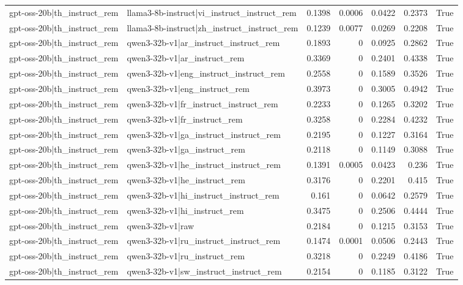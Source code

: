\begin{table}
\begin{tabular}{l l r r r r l}
gpt-oss-20b|th_instruct_rem & llama3-8b-instruct|vi_instruct_instruct_rem & 0.1398 & 0.0006 & 0.0422 & 0.2373 & True \\
gpt-oss-20b|th_instruct_rem & llama3-8b-instruct|zh_instruct_instruct_rem & 0.1239 & 0.0077 & 0.0269 & 0.2208 & True \\
gpt-oss-20b|th_instruct_rem & qwen3-32b-v1|ar_instruct_instruct_rem & 0.1893 & 0 & 0.0925 & 0.2862 & True \\
gpt-oss-20b|th_instruct_rem & qwen3-32b-v1|ar_instruct_rem & 0.3369 & 0 & 0.2401 & 0.4338 & True \\
gpt-oss-20b|th_instruct_rem & qwen3-32b-v1|eng_instruct_instruct_rem & 0.2558 & 0 & 0.1589 & 0.3526 & True \\
gpt-oss-20b|th_instruct_rem & qwen3-32b-v1|eng_instruct_rem & 0.3973 & 0 & 0.3005 & 0.4942 & True \\
gpt-oss-20b|th_instruct_rem & qwen3-32b-v1|fr_instruct_instruct_rem & 0.2233 & 0 & 0.1265 & 0.3202 & True \\
gpt-oss-20b|th_instruct_rem & qwen3-32b-v1|fr_instruct_rem & 0.3258 & 0 & 0.2284 & 0.4232 & True \\
gpt-oss-20b|th_instruct_rem & qwen3-32b-v1|ga_instruct_instruct_rem & 0.2195 & 0 & 0.1227 & 0.3164 & True \\
gpt-oss-20b|th_instruct_rem & qwen3-32b-v1|ga_instruct_rem & 0.2118 & 0 & 0.1149 & 0.3088 & True \\
gpt-oss-20b|th_instruct_rem & qwen3-32b-v1|he_instruct_instruct_rem & 0.1391 & 0.0005 & 0.0423 & 0.236 & True \\
gpt-oss-20b|th_instruct_rem & qwen3-32b-v1|he_instruct_rem & 0.3176 & 0 & 0.2201 & 0.415 & True \\
gpt-oss-20b|th_instruct_rem & qwen3-32b-v1|hi_instruct_instruct_rem & 0.161 & 0 & 0.0642 & 0.2579 & True \\
gpt-oss-20b|th_instruct_rem & qwen3-32b-v1|hi_instruct_rem & 0.3475 & 0 & 0.2506 & 0.4444 & True \\
gpt-oss-20b|th_instruct_rem & qwen3-32b-v1|raw & 0.2184 & 0 & 0.1215 & 0.3153 & True \\
gpt-oss-20b|th_instruct_rem & qwen3-32b-v1|ru_instruct_instruct_rem & 0.1474 & 0.0001 & 0.0506 & 0.2443 & True \\
gpt-oss-20b|th_instruct_rem & qwen3-32b-v1|ru_instruct_rem & 0.3218 & 0 & 0.2249 & 0.4186 & True \\
gpt-oss-20b|th_instruct_rem & qwen3-32b-v1|sw_instruct_instruct_rem & 0.2154 & 0 & 0.1185 & 0.3122 & True \\

\end{tabular}
\end{table}
